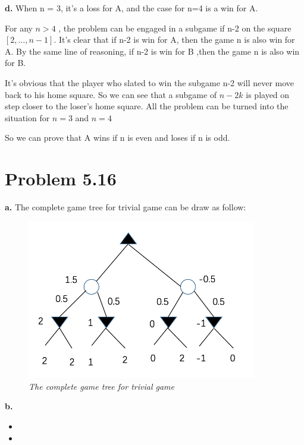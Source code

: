 \documentclass[a4paper,left=2.5cm,right=2.5cm,11pt]{article}
\newcommand{\wuhao}{\fontsize{10.5pt}{\baselineskip}\selectfont}    %
\begin{document}
\textbf{d.} When n = 3, it's a loss for A, and the case for n=4 is a win for A.\par 
For any $n >4$ , the problem can be engaged in a subgame if n-2 on the square 
$[2,\dots,n-1]$. It's clear that if n-2 is win for A, then the game n is also win for A.
By the same line of reasoning, if n-2 is win for B ,then the game n is also win for B. \par 
It's obvious that the player who slated to win the subgame n-2 will never move back to his home square. So we can see that a subgame of $n-2k$ is played on step closer to the loser's home square. All the problem can be turned into the situation for $n=3$ and $n=4$ \par 
So we can prove that A wins if n is even and loses if n is odd.



\section{Problem 5.16}
\textbf{a.} The complete game tree for trivial game can be draw as follow:
\begin{figure}[ht]
	\centering
	\includegraphics[width=10cm]{3.png}  
	\caption*{\small\it The complete game tree for trivial game}
\end{figure}

\textbf{b.} 
\begin{itemize}
\item  \wuhao {Given nodes 1~6, we would need to look at 7 and 8. If they are both $+\infty$ then the values of the min node and chance node above would be $+\infty$ and the best move will change.} 
\item \wuhao {Given nodes 1~7, we do not need to look at 8, even if it is $+\infty$, the min node can not be worth more than -1. So the chance node above can not be worth more than -0.5, the best move will not change.}
\end{itemize}
\end{document}
